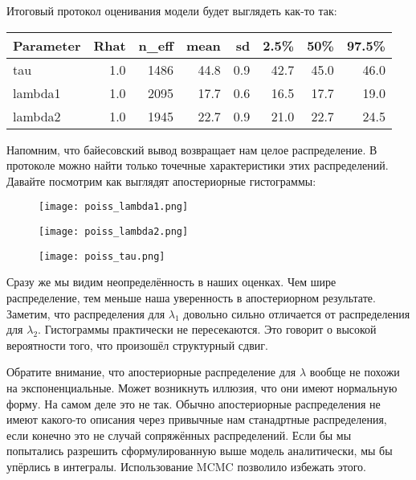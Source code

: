 Итоговый протокол оценивания модели будет выглядеть как-то так: 

\begin{table}[H]
	\centering
	\begin{tabular}{lrrrrrrr}
		\toprule
		Parameter & Rhat & n\_eff & mean & sd & 2.5\% & 50\% & 97.5\% \\ 
		\midrule
		tau & 1.0 & 1486 & 44.8 & 0.9 & 42.7 & 45.0 & 46.0 \\ 
		lambda1 & 1.0 & 2095 & 17.7 & 0.6 & 16.5 & 17.7 & 19.0 \\ 
		lambda2 & 1.0 & 1945 & 22.7 & 0.9 & 21.0 & 22.7 & 24.5 \\ 
		\bottomrule
	\end{tabular}
\end{table}

Напомним, что байесовский вывод возвращает нам целое распределение. В протоколе можно найти только точечные характеристики этих распределений. Давайте посмотрим как выглядят апостериорные гистограммы: 


\begin{figure}[H]
	\begin{minipage}[H]{0.47\linewidth}
		\begin{center}
			\texttt{[image: poiss\_lambda1.png]}
		\end{center}
	\end{minipage}
	\begin{minipage}[H]{0.47\linewidth}
		\begin{center}
			\texttt{[image: poiss\_lambda2.png]}
		\end{center}
	\end{minipage}
\begin{minipage}[H]{0.47\linewidth}
	\begin{center}
			\texttt{[image: poiss\_tau.png]}
	\end{center}
\end{minipage}
\end{figure}


Сразу же мы видим неопределённость  в наших оценках. Чем шире распределение, тем меньше наша уверенность в апостериорном результате.  Заметим, что распределения для $\lambda_1$ довольно сильно отличается от распределения для $\lambda_2$. Гистограммы практически не пересекаются. Это говорит о высокой вероятности того, что произошёл структурный сдвиг. 

Обратите внимание, что апостериорные распределение для $\lambda$ вообще не похожи на экспоненциальные. Может возникнуть иллюзия, что они имеют нормальную форму. На самом деле это не так. Обычно апостериорные распределения не имеют какого-то описания через привычные нам станадртные распределения, если конечно это не случай сопряжённых распределений. Если бы мы попытались разрешить сформулированную выше модель аналитически, мы бы упёрлись в интегралы. Использование MCMC позволило избежать этого. 

